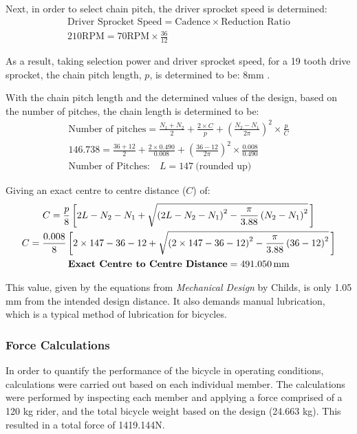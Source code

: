 \documentclass[a4paper,11pt]{article}
\begin{document}
Next, in order to select chain pitch, the driver sprocket speed is determined:
\begin{gather*}
	\text{Driver Sprocket Speed}=\text{Cadence}\times\text{Reduction Ratio}\\
	210\text{RPM}=70\text{RPM}\times\frac{36}{12}
\end{gather*}

As a result, taking selection power and driver sprocket speed, for a 19 tooth drive sprocket, the chain pitch length, $p$, is determined to be: 8mm \cite{childs04}.

With the chain pitch length and the determined values of the design, based on the number of pitches, the chain length is determined to be:
\begin{gather*}
	\text{Number of pitches}=\frac{N_{1}+N_{2}}{2}+\frac{2\times C}{p}+\left(\frac{N_{2}-N_{1}}{2{\pi}}\right)^{2}\times\frac{p}{C}\\
	146.738=\frac{36+12}{2}+\frac{2\times 0.490}{0.008}+\left(\frac{36-12}{2{\pi}}\right)^{2}\times\frac{0.008}{0.490}\\
	\text{Number of Pitches:}\quad L=147\ \text{(rounded up)}
\end{gather*}

Giving an exact centre to centre distance ($C$) of:
\begin{gather*}
	C=\frac{p}{8}\left[2L-N_{2}-N_{1}+\sqrt{\left(2L-N_{2}-N_{1}\right)^{2}-\frac{{\pi}}{3.88}\left(N_{2}-N_{1}\right)^{2}}\,\right]\\
	C=\frac{0.008}{8}\left[2\times 147-36-12+\sqrt{\left(2\times 147-36-12\right)^{2}-\frac{{\pi}}{3.88}\left(36-12\right)^{2}}\,\right]\\
	\text{\textbf{Exact Centre to Centre Distance}}=491.050\,\text{mm}
\end{gather*}

This value, given by the equations from \textit{Mechanical Design} by Childs, is only 1.05 mm from the intended design distance. It also demands manual lubrication, which is a typical method of lubrication for bicycles.

\subsubsection{Force Calculations}

In order to quantify the performance of the bicycle in operating conditions, calculations were carried out based on each individual member. The calculations were performed by inspecting each member and applying a force comprised of a 120 kg rider, and the total bicycle weight based on the design (24.663 kg). This resulted in a total force of 1419.144N. 
\end{document}
